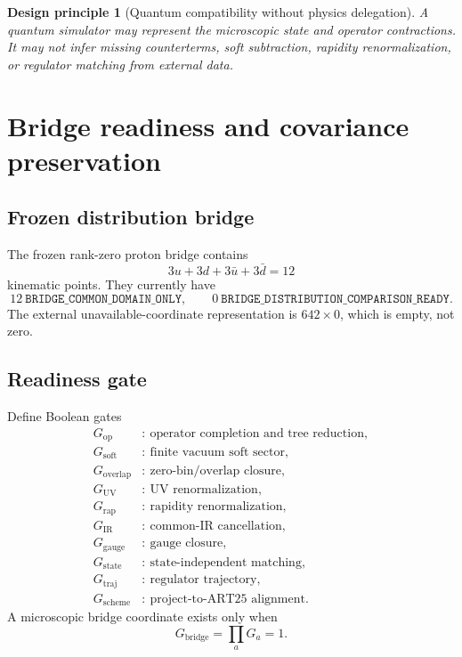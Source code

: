 \documentclass[11pt]{article}
\newtheorem{principle}[definition]{Design principle}
\newcommand{\Soft}{\ensuremath{\mathrm{soft}}}
\begin{document}
\begin{principle}[Quantum compatibility without physics delegation]
A quantum simulator may represent the microscopic state and operator contractions.  It may not infer missing counterterms, soft subtraction, rapidity renormalization, or regulator matching from external data.
\end{principle}

\section{Bridge readiness and covariance preservation}
\label{sec:bridge}

\subsection{Frozen distribution bridge}

The frozen rank-zero proton bridge contains
\begin{equation}
 3u+3d+3\bar u+3\bar d=12
 \label{eq:twelve-bridge}
\end{equation}
kinematic points.  They currently have
\begin{equation}
 12\ \texttt{BRIDGE\_COMMON\_DOMAIN\_ONLY},
 \qquad
 0\ \texttt{BRIDGE\_DISTRIBUTION\_COMPARISON\_READY}.
 \label{eq:bridge-status}
\end{equation}
The external unavailable-coordinate representation is \(642\times0\), which is empty, not zero.

\subsection{Readiness gate}

Define Boolean gates
\begin{align}
 G_{\mathrm{op}}&:\ \text{operator completion and tree reduction},\\
 G_{\Soft}&:\ \text{finite vacuum soft sector},\\
 G_{\mathrm{overlap}}&:\ \text{zero-bin/overlap closure},\\
 G_{\mathrm{UV}}&:\ \text{UV renormalization},\\
 G_{\mathrm{rap}}&:\ \text{rapidity renormalization},\\
 G_{\mathrm{IR}}&:\ \text{common-IR cancellation},\\
 G_{\mathrm{gauge}}&:\ \text{gauge closure},\\
 G_{\mathrm{state}}&:\ \text{state-independent matching},\\
 G_{\mathrm{traj}}&:\ \text{regulator trajectory},\\
 G_{\mathrm{scheme}}&:\ \text{project-to-ART25 alignment}.
 \label{eq:bridge-gates}
\end{align}
A microscopic bridge coordinate exists only when
\begin{equation}
 G_{\mathrm{bridge}}
 =
 \prod_{a}
 G_a
 =
 1.
 \label{eq:bridge-product}
\end{equation}
\end{document}
